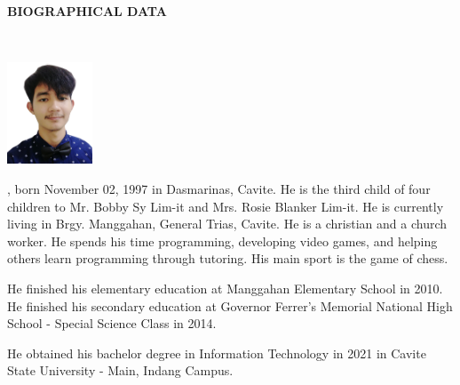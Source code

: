 \begin{doublespace}
	\thispagestyle{empty}

	\begin{center}
		\textbf{BIOGRAPHICAL DATA}
	\end{center}
	\leavevmode\\

	\begin{center}
		\includegraphics[width=1in]{media/brandon.jpg}
	\end{center}

	\justify
	\textbf{}, born November 02, 1997 in Dasmarinas, Cavite.
	He is the third child of four children to Mr. Bobby Sy Lim-it and Mrs.
	Rosie Blanker Lim-it. He is currently living in Brgy. Manggahan, General
	Trias, Cavite. He is a christian and a church worker. He spends his time
	programming, developing video games, and helping others learn programming through
	tutoring. His main sport is the game of chess.

	\parx
	He finished his elementary education at Manggahan Elementary School in 2010.
	He finished his secondary education at Governor Ferrer's Memorial National
	High School - Special Science Class in 2014.

	\parx
	He obtained his bachelor degree in Information Technology in 2021 in Cavite
	State University - Main, Indang Campus.
\end{doublespace}

